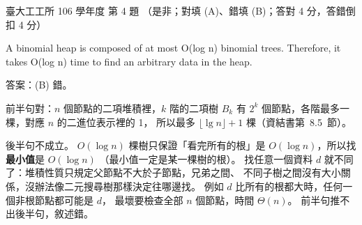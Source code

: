 \begin{pastexam}[label={px:ntu-106-ie-ds-04}]{臺大工工所 106 學年度 第 4 題}
（是非；對填 (A)、錯填 (B)；答對 4 分，答錯倒扣 4 分）

A binomial heap is composed of at most O(log n) binomial trees. Therefore, it takes O(log n) time to
find an arbitrary data in the heap.
\end{pastexam}

\begin{pastsoln}
答案：(B) 錯。

前半句對：$n$ 個節點的二項堆積裡，$k$ 階的二項樹 $B_k$ 有 $2^k$ 個節點，各階最多一棵，對應 $n$ 的二進位表示裡的 1，
所以最多 $\lfloor \lg n \rfloor + 1$ 棵（資結書第~8.5~節）。

後半句不成立。 $O(\log n)$ 棵樹只保證「看完所有的根」是 $O(\log n)$，所以找\textbf{最小值}是 $O(\log n)$
（最小值一定是某一棵樹的根）。 找任意一個資料 $d$ 就不同了：堆積性質只規定父節點不大於子節點，兄弟之間、
不同子樹之間沒有大小關係，沒辦法像二元搜尋樹那樣決定往哪邊找。 例如 $d$ 比所有的根都大時，任何一個非根節點都可能是 $d$，
最壞要檢查全部 $n$ 個節點，時間 $\Theta(n)$。 前半句推不出後半句，敘述錯。
\end{pastsoln}
